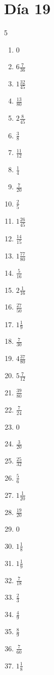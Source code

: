 \documentclass[12pt]{article}
\begin{document}
\section*{Día 19}
\begin{multicols}{5}\begin{enumerate}
\item $ 0 $
\item $ 6 \frac{7}{36} $
\item $ 1 \frac{32}{45} $
\item $ \frac{13}{80} $
\item $ 2 \frac{8}{45} $
\item $ \frac{3}{8} $
\item $ \frac{11}{12} $
\item $ \frac{1}{4} $
\item $ \frac{7}{20} $
\item $ \frac{2}{5} $
\item $ 1 \frac{26}{45} $
\item $ \frac{14}{15} $
\item $ 1 \frac{77}{80} $
\item $ \frac{5}{16} $
\item $ 2 \frac{1}{16} $
\item $ \frac{27}{50} $
\item $ 1 \frac{1}{9} $
\item $ \frac{7}{30} $
\item $ 4 \frac{37}{80} $
\item $ 5 \frac{7}{12} $
\item $ \frac{39}{80} $
\item $ \frac{7}{24} $
\item $ 0 $
\item $ \frac{3}{20} $
\item $ \frac{25}{32} $
\item $ \frac{5}{6} $
\item $ 1 \frac{1}{20} $
\item $ \frac{19}{20} $
\item $ 0 $
\item $ 1 \frac{1}{8} $
\item $ 1 \frac{1}{9} $
\item $ \frac{7}{18} $
\item $ \frac{2}{3} $
\item $ \frac{4}{9} $
\item $ \frac{8}{9} $
\item $ \frac{7}{60} $
\item $ 1 \frac{1}{8} $

\end{enumerate}
\end{multicols}
\end{document}
